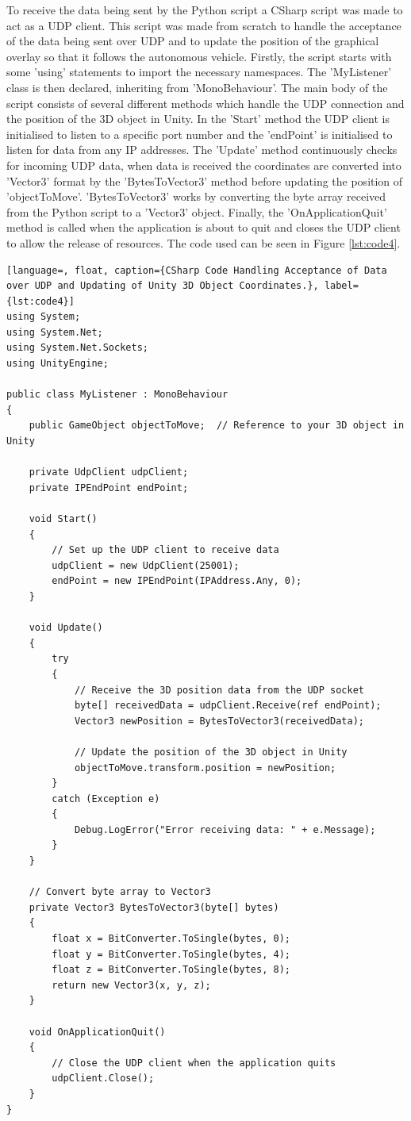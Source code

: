 \documentclass{l4proj}
\begin{document}
To receive the data being sent by the Python script a CSharp script was made to act as a UDP client. This script was made from scratch to handle the acceptance of the data being sent over UDP and to update the position of the graphical overlay so that it follows the autonomous vehicle. Firstly, the script starts with some 'using' statements to import the necessary namespaces. The 'MyListener' class is then declared, inheriting from 'MonoBehaviour'. The main body of the script consists of several different methods which handle the UDP connection and the position of the 3D object in Unity. In the 'Start' method the UDP client is initialised to listen to a specific port number and the 'endPoint' is initialised to listen for data from any IP addresses. The 'Update' method continuously checks for incoming UDP data, when data is received the coordinates are converted into 'Vector3' format by the 'BytesToVector3' method before updating the position of 'objectToMove'. 'BytesToVector3' works by converting the byte array received from the Python script to a 'Vector3' object. Finally, the 'OnApplicationQuit' method is called when the application is about to quit and closes the UDP client to allow the release of resources. The code used can be seen in Figure \ref{lst:code4}.

\begin{lstlisting}[language=, float, caption={CSharp Code Handling Acceptance of Data over UDP and Updating of Unity 3D Object Coordinates.}, label={lst:code4}]
using System;
using System.Net;
using System.Net.Sockets;
using UnityEngine;

public class MyListener : MonoBehaviour
{
    public GameObject objectToMove;  // Reference to your 3D object in Unity

    private UdpClient udpClient;
    private IPEndPoint endPoint;

    void Start()
    {
        // Set up the UDP client to receive data
        udpClient = new UdpClient(25001);
        endPoint = new IPEndPoint(IPAddress.Any, 0);
    }

    void Update()
    {
        try
        {
            // Receive the 3D position data from the UDP socket
            byte[] receivedData = udpClient.Receive(ref endPoint);
            Vector3 newPosition = BytesToVector3(receivedData);

            // Update the position of the 3D object in Unity
            objectToMove.transform.position = newPosition;
        }
        catch (Exception e)
        {
            Debug.LogError("Error receiving data: " + e.Message);
        }
    }

    // Convert byte array to Vector3
    private Vector3 BytesToVector3(byte[] bytes)
    {
        float x = BitConverter.ToSingle(bytes, 0);
        float y = BitConverter.ToSingle(bytes, 4);
        float z = BitConverter.ToSingle(bytes, 8);
        return new Vector3(x, y, z);
    }

    void OnApplicationQuit()
    {
        // Close the UDP client when the application quits
        udpClient.Close();
    }
}
\end{lstlisting}
\end{document}
